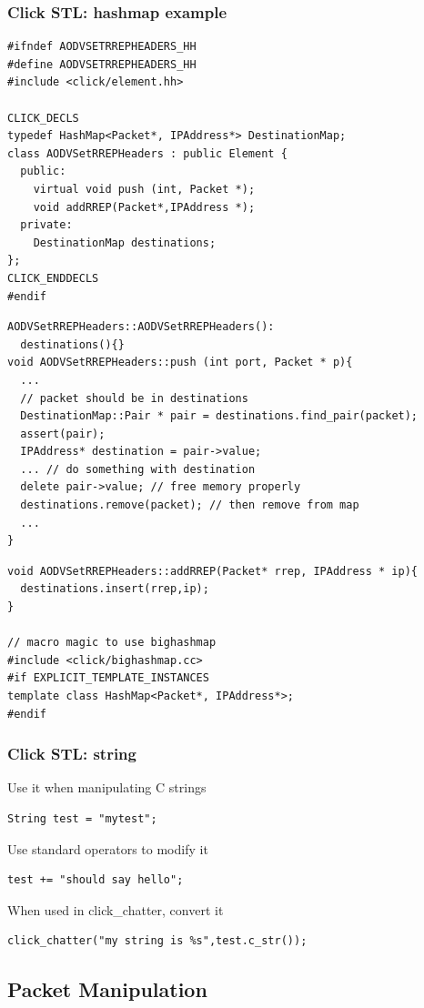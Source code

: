 \documentclass{beamer}
\begin{document}
\begin{frame}
\frametitle{Click STL: hashmap example}
\begin{lstlisting}[basicstyle=\footnotesize]
#ifndef AODVSETRREPHEADERS_HH
#define AODVSETRREPHEADERS_HH
#include <click/element.hh>

CLICK_DECLS
typedef HashMap<Packet*, IPAddress*> DestinationMap;
class AODVSetRREPHeaders : public Element { 
  public:
    virtual void push (int, Packet *);
    void addRREP(Packet*,IPAddress *);
  private:
    DestinationMap destinations;
};
CLICK_ENDDECLS
#endif
\end{lstlisting}
\begin{lstlisting}[basicstyle=\footnotesize]
AODVSetRREPHeaders::AODVSetRREPHeaders(): 
  destinations(){}
void AODVSetRREPHeaders::push (int port, Packet * p){
  ...
  // packet should be in destinations
  DestinationMap::Pair * pair = destinations.find_pair(packet);
  assert(pair);
  IPAddress* destination = pair->value;
  ... // do something with destination
  delete pair->value; // free memory properly
  destinations.remove(packet); // then remove from map
  ...
}
\end{lstlisting}
\begin{lstlisting}[basicstyle=\footnotesize]
void AODVSetRREPHeaders::addRREP(Packet* rrep, IPAddress * ip){
  destinations.insert(rrep,ip);
}

// macro magic to use bighashmap
#include <click/bighashmap.cc>
#if EXPLICIT_TEMPLATE_INSTANCES
template class HashMap<Packet*, IPAddress*>;
#endif
\end{lstlisting}
\end{frame}

\begin{frame}[fragile]
\frametitle{Click STL: string}
Use it when manipulating C strings
\begin{lstlisting}
String test = "mytest";
\end{lstlisting}
Use standard operators to modify it
\begin{lstlisting}
test += "should say hello";
\end{lstlisting}
When used in click\_chatter, convert it
\begin{lstlisting}
click_chatter("my string is %s",test.c_str());
\end{lstlisting}
\end{frame}

\subsection{Packet Manipulation} %
\label{sub:packet_manipulation}
\end{document}
